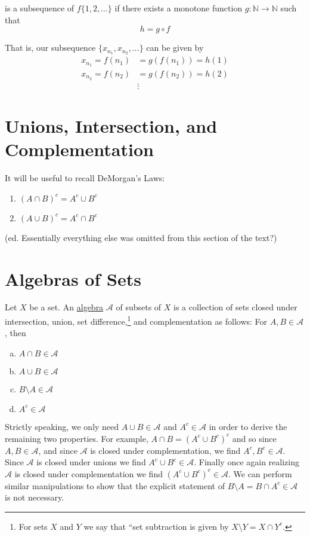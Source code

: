 \documentclass[12pt]{article}
\newlength\tindent
\renewcommand{\indent}{\hspace*{\tindent}}
\newcommand{\N}{\mathbb N}
\begin{document}
is a subsequence of $f\{1,2,...\}$ if there exists a monotone function $g:\N\to\N$ such that
\begin{equation*}
	h = g \circ f
\end{equation*}

That is, our subsequence $\{x_{n_1}, x_{n_2},...\}$ can be given by
\begin{align*}
	x_{n_1} = f(n_1) &= g(f(n_1)) = h(1)  \\
	x_{n_2} = f(n_2) &= g(f(n_2)) = h(2) \\
	&\vdots
\end{align*}

\section{Unions, Intersection, and Complementation}

It will be useful to recall DeMorgan's Laws:
\begin{enumerate}[(1)]
	\item $(A \cap B)^c = A^c \cup B^c$
	\item $(A \cup B)^c = A^c \cap B^c$
\end{enumerate}

(ed. Essentially everything else was omitted from this section of the text?)

\section{Algebras of Sets}

Let $X$ be a set. An \underline{algebra} $\mathcal A$ of subsets of $X$ is a collection of sets closed under intersection, union, set difference,\footnote{For sets $X$ and $Y$ we say that ``set subtraction is given by $X \setminus Y = X \cap Y^c$.} and complementation as follows: For $A, B \in \mathcal A$, then
\begin{enumerate}[(a)]
	\item $A \cap B \in \mathcal A$
	\item $A \cup B \in \mathcal A$
	\item $B \setminus A \in \mathcal A$
	\item $A^c \in \mathcal A$
\end{enumerate}

\indent Strictly speaking, we only need $A \cup B \in \mathcal A$ and $A^c \in \mathcal A$ in order to derive the remaining two properties. For example, $A \cap B = (A^c \cup B^c)^c$ and so since $A, B \in \mathcal A$, and since $\mathcal A$ is closed under complementation, we find $A^c, B^c \in \mathcal A$. Since $\mathcal A$ is closed under unions we find $A^c \cup B^c \in \mathcal A$. Finally once again realizing $\mathcal A$ is closed under complementation we find $(A^c \cup B^c)^c \in \mathcal A$. We can perform similar manipulations to show that the explicit statement of $B \setminus A = B \cap A^c \in \mathcal A$ is not necessary. \\
\end{document}
